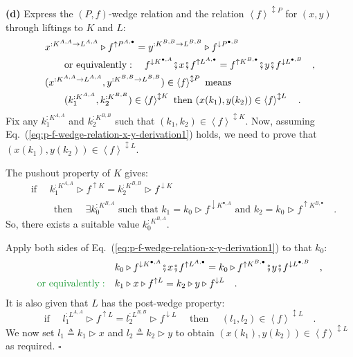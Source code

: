 \textbf{(d)} Express the $\left(P,f\right)$-wedge relation and the
relation $\left<f\right>^{\updownarrow P}$ for $(x,y)$ through liftings
to $K$ and $L$:
\begin{align}
 & x^{:K^{A,A}\rightarrow L^{A,A}}\triangleright f^{\uparrow P^{A,\bullet}}=y^{:K^{B,B}\rightarrow L^{B,B}}\triangleright f^{\downarrow P^{\bullet,B}}\nonumber \\
 & \quad\quad\text{or equivalently}:\quad f^{\downarrow K^{\bullet,A}}\bef x\bef f^{\uparrow L^{A,\bullet}}=f^{\uparrow K^{B,\bullet}}\bef y\bef f^{\downarrow L^{\bullet,B}}\quad,\label{eq:p-f-wedge-relation-x-y-derivation1}\\
 & (x^{:K^{A,A}\rightarrow L^{A,A}},y^{:K^{B,B}\rightarrow L^{B,B}})\in\left<f\right>^{\updownarrow P}\text{ means }\nonumber \\
 & \quad\quad(k_{1}^{:K^{A,A}},k_{2}^{:K^{B,B}})\in\left<f\right>^{\updownarrow K}\text{ then }(x(k_{1}),y(k_{2}))\in\left<f\right>^{\updownarrow L}\quad.\nonumber 
\end{align}
Fix any $k_{1}^{:K^{A,A}}$ and $k_{2}^{:K^{B,B}}$ such that $(k_{1},k_{2})\in\left<f\right>^{\updownarrow K}$.
Now, assuming Eq.~(\ref{eq:p-f-wedge-relation-x-y-derivation1})
holds, we need to prove that $(x(k_{1}),y(k_{2}))\in\left<f\right>^{\updownarrow L}$.

The pushout property of $K$ gives:
\begin{align*}
 & \text{if }\quad k_{1}^{:K^{A,A}}\triangleright f^{\uparrow K}=k_{2}^{:K^{B,B}}\triangleright f^{\downarrow K}\\
 & \quad\quad\text{ then }\quad\exists k_{0}^{:K^{B,A}}\text{ such that }k_{1}=k_{0}\triangleright f^{\downarrow K^{\bullet,A}}\text{ and }k_{2}=k_{0}\triangleright f^{\uparrow K^{B,\bullet}}\quad.
\end{align*}
So, there exists a suitable value $k_{0}^{:K^{B,A}}$.%

{} Apply both sides of Eq.~(\ref{eq:p-f-wedge-relation-x-y-derivation1})
to that $k_{0}$:
\begin{align*}
 & k_{0}\triangleright f^{\downarrow K^{\bullet,A}}\bef x\bef f^{\uparrow L^{A,\bullet}}=k_{0}\triangleright f^{\uparrow K^{B,\bullet}}\bef y\bef f^{\downarrow L^{\bullet,B}}\quad,\\
{\color{greenunder}\text{or equivalently}:}\quad & k_{1}\triangleright x\triangleright f^{\uparrow L}=k_{2}\triangleright y\triangleright f^{\downarrow L}\quad.
\end{align*}
 It is also given that $L$ has the post-wedge property:
\[
\text{if }\quad l_{1}^{:L^{A,A}}\triangleright f^{\uparrow L}=l_{2}^{:L^{B,B}}\triangleright f^{\downarrow L}\quad\text{ then }\quad(l_{1},l_{2})\in\left<f\right>^{\updownarrow L}\quad.
\]
We now set $l_{1}\triangleq k_{1}\triangleright x$ and $l_{2}\triangleq k_{2}\triangleright y$
to obtain $(x(k_{1}),y(k_{2}))\in\left<f\right>^{\updownarrow L}$
as required. $\square$

